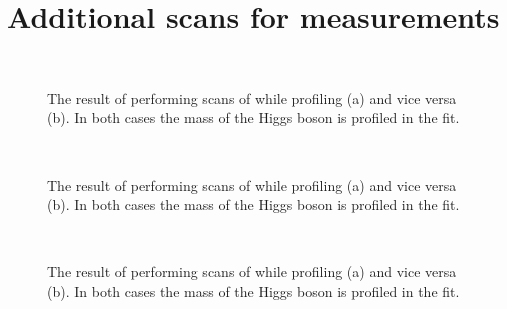 \chapter{Additional \DNLL scans for measurements}
\label{app:dnll_scans}


\begin{figure}[ht!]
\centering
{} \\
\caption{The result of performing \DNLL scans of \muV while profiling \muF (a) and vice versa (b). In both cases the mass of the Higgs boson is profiled in the fit. }
\label{fig:statandresults:mu_per_rv_and_rf}
\end{figure}

\begin{figure}[ht!]
\centering
{} \\
\caption{The result of performing \DNLL scans of \kV while profiling \kf (a) and vice versa (b). In both cases the mass of the Higgs boson is profiled in the fit. }
\label{fig:statandresults:kappa_per_v_and_f}
\end{figure}

\begin{figure}[ht!]
\centering
{} \\
\caption{The result of performing \DNLL scans of \kGlu while profiling \kPho (a) and vice versa (b). In both cases the mass of the Higgs boson is profiled in the fit. }
\label{fig:statandresults:kappa_per_g_and_g}
\end{figure}
